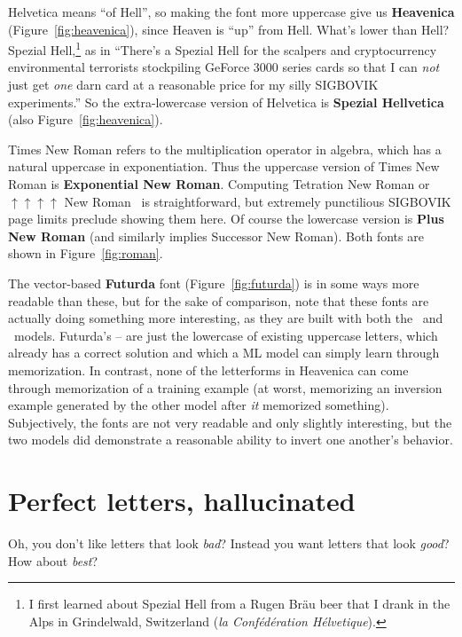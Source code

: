 \documentclass[twocolumn]{article}
\begin{document}
Helvetica means ``of Hell'', so making the font more uppercase give us
{\bf Heavenica} (Figure~\ref{fig:heavenica}), since Heaven is ``up''
from Hell. What's lower than Hell? Spezial Hell,\footnote{
  I first learned about Spezial Hell from a Rugen Br\"au beer that I
  drank in the Alps in Grindelwald, Switzerland ({\it la
    Conf\'ed\'eration H\'elvetique}).
}
%
as in ``There's a Spezial Hell for the scalpers and cryptocurrency
environmental terrorists stockpiling GeForce 3000 series cards so that
I can {\em not} just get {\em one} darn card at a reasonable price for
my silly SIGBOVIK experiments.'' So the extra-lowercase version of
Helvetica is {\bf Spezial Hellvetica} (also Figure~\ref{fig:heavenica}).

Times New Roman refers to the multiplication operator in algebra,
which has a natural uppercase in exponentiation. Thus the uppercase
version of Times New Roman is {\bf Exponential New Roman}. Computing
Tetration New Roman or $\uparrow\uparrow\uparrow\uparrow$ New
Roman~\cite{knuth1976coping} is straightforward, but extremely
punctilious SIGBOVIK page limits preclude showing them here. Of course
the lowercase version is {\bf Plus New Roman} (and similarly implies
Successor New Roman). Both fonts are shown in Figure~\ref{fig:roman}.

The vector-based {\bf Futurda} font (Figure~\ref{fig:futurda}) is in
some ways more readable than these, but for the sake of comparison,
note that these fonts are actually doing something more interesting,
as they are built with both the \makeuppercase\ and
\makelowercase\ models. Futurda's -- are
just the lowercase of existing uppercase letters, which already has a
correct solution and which a ML model can simply learn through
memorization. In contrast, none of the letterforms in Heavenica can
come through memorization of a training example (at worst, memorizing
an inversion example generated by the other model after {\em it}
memorized something). Subjectively, the fonts are not very readable
and only slightly interesting, but the two models did demonstrate a
reasonable ability to invert one another's behavior.

\section{Perfect letters, hallucinated} \label{sec:hallucination}

Oh, you don't like letters that look {\em bad}? Instead you want
letters that look {\em good}? How about {\em best}?
\end{document}
